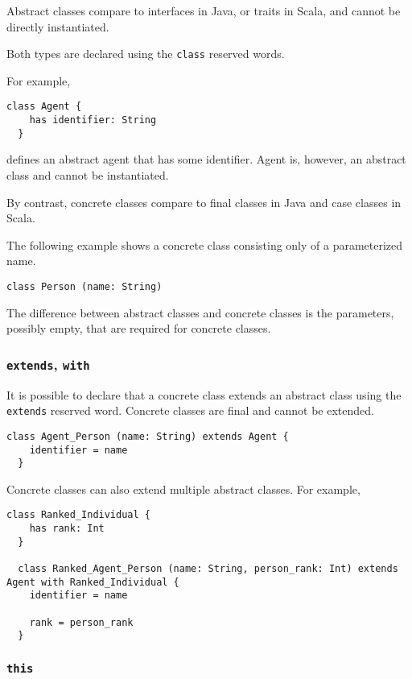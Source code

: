 \documentclass[12pt,a4paper]{article}
\newcommand{\srccode}[1]{\texttt{{#1}}}
\newcommand{\reservedWord}[1]{{\color{blue}\srccode{#1}}\xspace}
\newcommand{\sclass}{\reservedWord{class}}
\newcommand{\sextends}{\reservedWord{extends}}
\newcommand{\swith}{\reservedWord{with}}
\newcommand{\sthis}{\reservedWord{this}}
\begin{document}
    Abstract classes compare to interfaces in Java, or traits in Scala, and cannot be directly instantiated.

    Both types are declared using the \sclass reserved words.

    For example,
    \begin{lstlisting}[label={lst:exampleAbstractClass}]
  class Agent {
    has identifier: String
  }
    \end{lstlisting}
    defines an abstract agent that has some identifier.
    Agent is, however, an abstract class and cannot be instantiated.

    By contrast, concrete classes compare to final classes in Java and case classes in Scala.

    The following example shows a concrete class consisting only of a parameterized name.
    \begin{lstlisting}[label={lst:exampleConcreteClass}]
  class Person (name: String)
    \end{lstlisting}

    The difference between abstract classes and concrete classes is the parameters, possibly empty, that are required for concrete classes.

    \subsubsection{\sextends, \swith}

    It is possible to declare that a concrete class extends an abstract class using the \sextends reserved word.
    Concrete classes are final and cannot be extended.

    \begin{lstlisting}[label={lst:exampleExtends}]
  class Agent_Person (name: String) extends Agent {
    identifier = name
  }
    \end{lstlisting}

    Concrete classes can also extend multiple abstract classes.
    For example,
    \begin{lstlisting}[label={lst:exampleWith}]
  class Ranked_Individual {
    has rank: Int
  }

  class Ranked_Agent_Person (name: String, person_rank: Int) extends Agent with Ranked_Individual {
    identifier = name

    rank = person_rank
  }
    \end{lstlisting}

    \subsubsection{\sthis}
\end{document}

